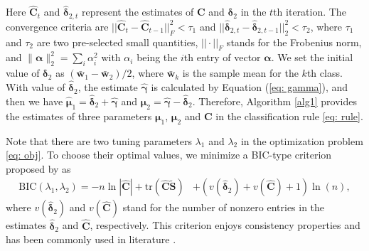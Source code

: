 \documentclass[12pt]{article}
\newcommand{\tr}{\mbox{tr}}
\begin{document}
Here $\hat{\bm C}_t$ and $\hat{\bm \delta}_{2,t}$ represent the estimates of $\bm C$ and $\bm \delta_2$ in the $t$th iteration.
The convergence criteria are $||\hat{\bm C}_t-\hat{\bm C}_{t-1}||_F^2<\tau_1$ and $||\hat{\bm \delta}_{2,t}-\hat{\bm \delta}_{2,{t-1}}||_2^2<\tau_2$,
where $\tau_1$ and $\tau_2$ are two pre-selected small quantities, $||\cdot||_F$ stands for the Frobenius norm,
and $\| \bm \alpha \|_2^2 = \mathop{\sum}\limits_i \alpha_i^2$ with $\alpha_i$ being the $i$th entry of vector $\bm \alpha$.
We set the initial value of $\bm \delta_2$ as $(\bar{\bm w}_1-\bar{\bm w}_2)/2$,
where $\bar{\bm w}_k$ is the sample mean for the $k$th class.
With value of $\hat{\bm \delta}_2$, the estimate $\hat{\bm \gamma}$ is calculated by Equation (\ref{eq: gamma}),
and then we have $\hat{\bm \mu}_1=\hat{\bm \delta}_2+\hat{\bm \gamma}$ and $\hat{\bm \mu}_2=\hat{\bm \gamma}-\hat{\bm \delta}_2$.
Therefore, Algorithm \ref{alg1} provides the estimates of three parameters $\bm \mu_1$, $\bm \mu_2$ and $\bm C$ in the classification rule \eqref{eq: rule}.



Note that there are two tuning parameters $\lambda_1$ and $\lambda_2$ in the optimization problem \eqref{eq: obj}.
To choose their optimal values, we minimize a BIC-type criterion proposed by \cite{wang2007tuning} as
\begin{align*}
\mbox{BIC}(\lambda_1,\lambda_2)=-n\ln|\hat{\bm C}| + \tr(\hat{\bm C}\tilde{\bm S})& + (v(\hat{\bm \delta}_2) + v(\hat{\bm C}) + 1) \ln(n),
\end{align*}
where $v(\hat{\bm \delta}_2)$ and $v(\hat{\bm C})$ stand for the number of nonzero entries in the estimates $\hat{\bm \delta}_2$ and $\hat{\bm C}$, respectively.
This criterion enjoys consistency properties and has been commonly used in literature \citep{zou2009on, lv2009a, armagan2013generalized}.
\end{document}
